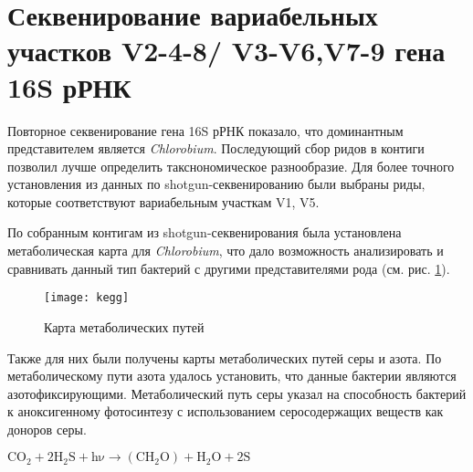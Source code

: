 \section{Секвенирование вариабельных участков V2-4-8/ V3-V6,V7-9 гена 16S рРНК} \label{sect2_2}


Повторное секвенирование гена 16S рРНК показало, что доминантным представителем является \textit{Chlorobium}. Последующий сбор ридов в контиги позволил лучше определить такснономическое разнообразие. Для более точного установления из данных по shotgun-секвенированию были выбраны риды, которые соответствуют вариабельным участкам V1, V5. 

По собранным контигам из shotgun-секвенирования была установлена метаболическая карта для \textit{Chlorobium}, что дало возможность анализировать и сравнивать данный тип бактерий с другими представителями рода (см. рис. \ref{img:kegg}). 

\begin{figure}[h]
  \texttt{[image: kegg]}
  \centering
  \caption{Карта метаболических путей}
  \label{img:kegg}  
\end{figure}

Также для них были получены карты метаболических путей серы и азота. По метаболическому пути азота удалось установить, что данные бактерии являются азотофиксирующими. Метаболический путь серы указал на способность бактерий к аноксигенному фотосинтезу с использованием серосодержащих веществ как доноров серы. 

\center $\mathrm{C O_2 + 2H_2 S + h\nu \xrightarrow{} (C H_2 O) + H_2 O + 2 S}$


\clearpage
